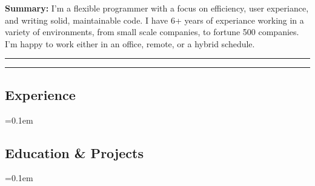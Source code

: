 





\textbf{Summary:} I'm a flexible programmer with a focus on efficiency, user
experiance, and writing solid, maintainable code. I have 6+ years of experiance
working in a variety of environments, from small scale companies, to fortune
500 companies. I'm happy to work either in an office, remote, or a hybrid
schedule.

\vspace{0.8em}
\hrule
\begin{description*}
  
  
\end{description*}
\hrule

\subsection*{Experience}
\begin{itemize}
  \parskip=0.1em

  
  
  
  
  
  

\clearpage

  
  
  
\end{itemize}


\vspace{-0.4em}
\subsection*{Education \& Projects}
\begin{itemize}
  \parskip=0.1em

  
  
  
  
\end{itemize}


%   

